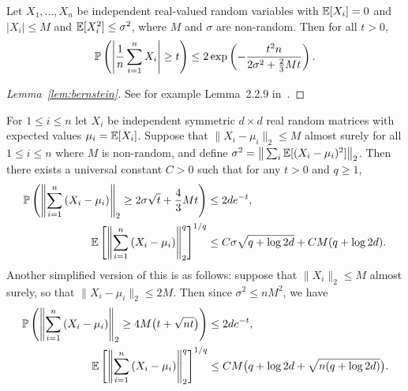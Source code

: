 \begin{lemma}
  \label{lem:bernstein}

  Let $X_1, \ldots, X_n$ be independent real-valued
  random variables with
  $\E[X_i] = 0$ and $|X_i| \leq M$ and
  $\E[X_i^2] \leq \sigma^2$,
  where $M$ and $\sigma$ are non-random.
  Then for all $t>0$,
  \begin{align*}
    \P \left(
      \left| \frac{1}{n} \sum_{i=1}^n X_i \right| \geq t
    \right)
    \leq 2 \exp \left( -
      \frac{t^2 n}
      {2 \sigma^2 + \frac{2}{3} M t}
    \right).
  \end{align*}

\end{lemma}

\begin{proof}[Lemma~\ref{lem:bernstein}]

  See for example
  Lemma~2.2.9 in~\citet{van1996weak}.
\end{proof}

\begin{lemma}
  \label{lem:matrix_bernstein}

  For $1 \leq i \leq n$
  let $X_i$ be independent symmetric $d \times d$
  real random matrices
  with expected values $\mu_i = \E[X_i]$.
  Suppose that
  $\|X_i - \mu_i\|_2 \leq M$
  almost surely for all $1 \leq i \leq n$
  where $M$ is non-random, and define
  $\sigma^2 = \big\| \sum_i \E[(X_i - \mu_i)^2] \big\|_2$.
  Then there exists a universal constant $C > 0$
  such that
  for any $t > 0$ and $q \geq 1$,
  \begin{align*}
    \P\left(
      \left\|
      \sum_{i=1}^n
      \left(
        X_i - \mu_i
      \right)
      \right\|_2
      \geq
      2 \sigma \sqrt{t}
      + \frac{4}{3} M t
    \right)
    &\leq
    2 d e^{-t}, \\
    \E\left[
      \left\|
      \sum_{i=1}^n
      \left(
        X_i - \mu_i
      \right)
      \right\|_2^q
    \right]^{1/q}
    &\leq
    C \sigma \sqrt{q + \log 2d}
    + C M (q + \log 2d).
  \end{align*}
  Another simplified version of this is as follows:
  suppose that
  $\|X_i\|_2 \leq M$ almost surely,
  so that
  $\|X_i - \mu_i\|_2 \leq 2M$.
  Then since
  $\sigma^2 \leq n M^2$,
  we have
  \begin{align*}
    \P\left(
      \left\|
      \sum_{i=1}^n
      \left(
        X_i - \mu_i
      \right)
      \right\|_2
      \geq
      4M \big(t + \sqrt{n t}\big)
    \right)
    &\leq
    2 d e^{-t}, \\
    \E\left[
      \left\|
      \sum_{i=1}^n
      \left(
        X_i - \mu_i
      \right)
      \right\|_2^q
    \right]^{1/q}
    &\leq
    C M
    \big(q + \log 2d + \sqrt{n(q + \log 2d)}\big).
  \end{align*}

\end{lemma}

